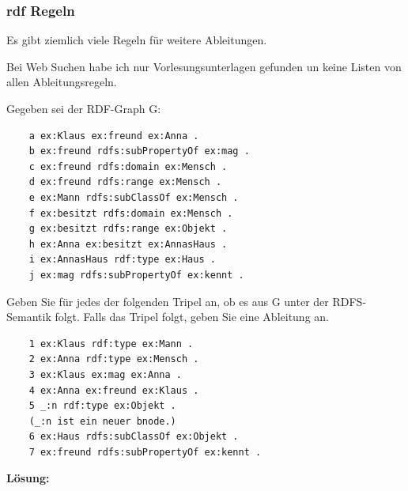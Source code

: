 \documentclass[a4paper]{article}
\begin{document}
\subsubsection{rdf Regeln}

Es gibt ziemlich viele Regeln für weitere Ableitungen.

Bei Web Suchen habe ich nur Vorlesungsunterlagen gefunden un keine Listen von allen Ableitungsregeln.


Gegeben sei der RDF-Graph G:

\begin{lstlisting}
    a ex:Klaus ex:freund ex:Anna .
    b ex:freund rdfs:subPropertyOf ex:mag .
    c ex:freund rdfs:domain ex:Mensch .
    d ex:freund rdfs:range ex:Mensch .
    e ex:Mann rdfs:subClassOf ex:Mensch .
    f ex:besitzt rdfs:domain ex:Mensch .
    g ex:besitzt rdfs:range ex:Objekt .
    h ex:Anna ex:besitzt ex:AnnasHaus .
    i ex:AnnasHaus rdf:type ex:Haus .
    j ex:mag rdfs:subPropertyOf ex:kennt .
\end{lstlisting}

Geben Sie für jedes der folgenden Tripel an,
ob es aus G unter der RDFS-Semantik folgt.
Falls das Tripel folgt, geben Sie eine
Ableitung an.

\begin{lstlisting}
    1 ex:Klaus rdf:type ex:Mann .
    2 ex:Anna rdf:type ex:Mensch .
    3 ex:Klaus ex:mag ex:Anna .
    4 ex:Anna ex:freund ex:Klaus .
    5 _:n rdf:type ex:Objekt .
    (_:n ist ein neuer bnode.)
    6 ex:Haus rdfs:subClassOf ex:Objekt .
    7 ex:freund rdfs:subPropertyOf ex:kennt .
\end{lstlisting}


\textbf{Lösung:}
\end{document}
